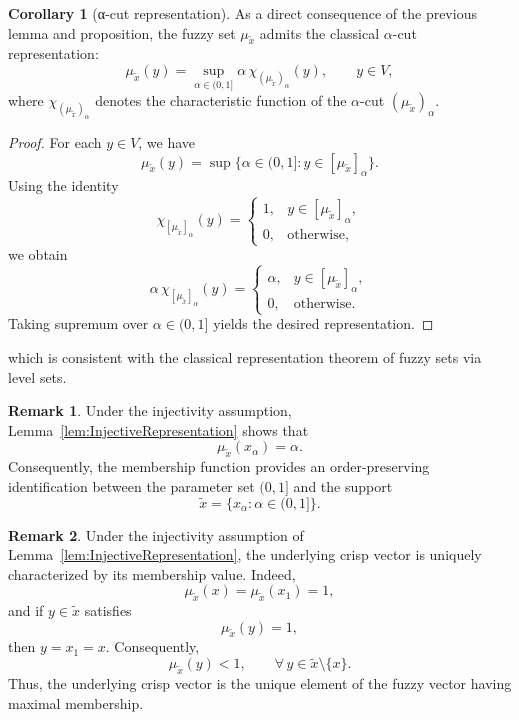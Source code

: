 \documentclass[preprint,12pt]{elsarticle}
\theoremstyle{definition}
\newtheorem{remark}{Remark}[section]
\newtheorem{corollary}[theorem]{Corollary}
\begin{document}
 \begin{corollary}[α-cut representation] As a direct consequence of the previous lemma and proposition, the fuzzy set $\mu_{\tilde{x}}$ admits the classical $\alpha$-cut representation: \[ \mu_{\tilde{x}}(y) = \sup_{\alpha\in(0,1]} \alpha \,\chi_{(\mu_{\tilde{x}})_\alpha}(y), \qquad y\in V, \] where $\chi_{(\mu_{\tilde{x}})_\alpha}$ denotes the characteristic function of the $\alpha$-cut $(\mu_{\tilde{x}})_\alpha$. \end{corollary} \begin{proof} For each $y\in V$, we have \[ \mu_{\tilde{x}}(y) = \sup\{\alpha\in(0,1]: y\in [\mu_{\tilde{x}}]_\alpha\}. \] Using the identity \[ \chi_{[\mu_{\tilde{x}}]_\alpha}(y) = \begin{cases} 1, & y\in [\mu_{\tilde{x}}]_\alpha,\\ 0, & \text{otherwise}, \end{cases} \] we obtain \[ \alpha \,\chi_{[\mu_{\tilde{x}}]_\alpha}(y) = \begin{cases} \alpha, & y\in [\mu_{\tilde{x}}]_\alpha,\\ 0, & \text{otherwise}. \end{cases} \] Taking supremum over $\alpha\in(0,1]$ yields the desired representation.\qedhere\end{proof} which is consistent with the classical representation theorem of fuzzy sets via level sets. 
\begin{remark}
	Under the injectivity assumption, Lemma~\ref{lem:InjectiveRepresentation}
	shows that
	\[
	\mu_{\tilde{x}}(x_\alpha)=\alpha.
	\]
	Consequently, the membership function provides an order-preserving identification
	between the parameter set $(0,1]$ and the support
	\[
	\widetilde{x}=\{x_\alpha:\alpha\in(0,1]\}.
	\]
\end{remark}


 \begin{remark}
 	Under the injectivity assumption of
 	Lemma~\ref{lem:InjectiveRepresentation},
 	the underlying crisp vector is uniquely characterized by its membership
 	value. Indeed,
 	\[
 	\mu_{\widetilde{x}}(x)
 	=
 	\mu_{\widetilde{x}}(x_1)
 	=
 	1,
 	\]
 	and if \(y\in\widetilde{x}\) satisfies
 	\[
 	\mu_{\widetilde{x}}(y)=1,
 	\]
 	then \(y=x_1=x\). Consequently,
 	\[
 	\mu_{\widetilde{x}}(y)<1,
 	\qquad
 	\forall\,y\in\widetilde{x}\setminus\{x\}.
 	\]
 	Thus, the underlying crisp vector is the unique element of the fuzzy
 	vector having maximal membership.
 \end{remark}
\end{document}
